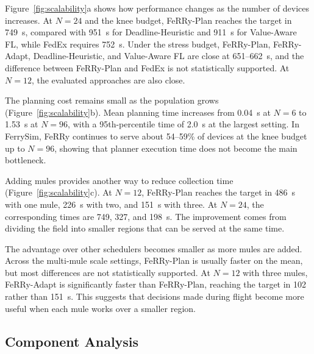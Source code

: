 \documentclass[conference]{IEEEtran}
\newcommand{\sysname}{FeRRy}
\begin{document}
Figure~\ref{fig:scalability}a shows how performance changes as the number of
devices increases. At \(N=24\) and the knee budget, \sysname{}-Plan reaches the
target in 749~s, compared with 951~s for Deadline-Heuristic and 911~s for
Value-Aware FL, while FedEx requires 752~s. Under the stress budget,
\sysname{}-Plan, \sysname{}-Adapt, Deadline-Heuristic, and Value-Aware FL are
close at 651--662~s, and the difference between \sysname{}-Plan and FedEx is not
statistically supported. At \(N=12\), the evaluated approaches are also close.

The planning cost remains small as the population grows
(Figure~\ref{fig:scalability}b). Mean planning time increases from 0.04~s at
\(N=6\) to 1.53~s at \(N=96\), with a 95th-percentile time of 2.0~s at the
largest setting. In FerrySim, \sysname{} continues to serve about 54--59\% of
devices at the knee budget up to \(N=96\), showing that planner execution time
does not become the main bottleneck.

Adding mules provides another way to reduce collection time
(Figure~\ref{fig:scalability}c). At \(N=12\), \sysname{}-Plan reaches the target
in 486~s with one mule, 226~s with two, and 151~s with three. At \(N=24\), the
corresponding times are 749, 327, and 198~s. The improvement comes from dividing
the field into smaller regions that can be served at the same time.

The advantage over other schedulers becomes smaller as more mules are added.
Across the multi-mule scale settings, \sysname{}-Plan is usually faster on the
mean, but most differences are not statistically supported. At \(N=12\) with
three mules, \sysname{}-Adapt is significantly faster than \sysname{}-Plan,
reaching the target in 102 rather than 151~s. This suggests that decisions made
during flight become more useful when each mule works over a smaller region.

\subsection{Component Analysis}
\label{sec:components}
\end{document}
